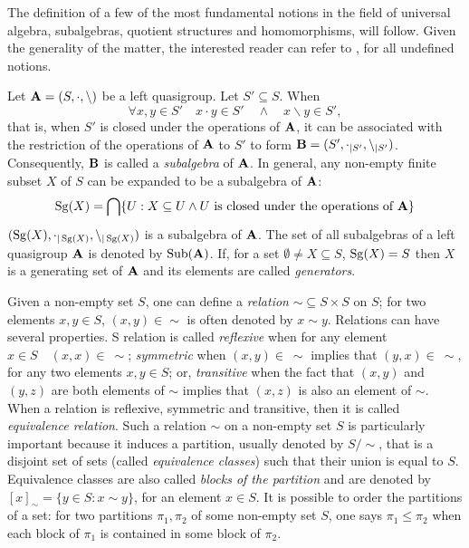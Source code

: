 \noindent The definition of a few of the most fundamental notions in the field of universal algebra, subalgebras, quotient structures and homomorphisms, will follow. Given the generality of the matter, the interested reader can refer to \cite{burris1981course}, for all undefined notions.
\begin{definition} \cite{burris1981course}\newline
Let $\mathbf{A} = (S, \cdot, \backslash)$ be a left quasigroup. Let $S'\subseteq S$. When \[\forall x,y \in S'\quad x\cdot y \in S'\quad\land\quad x\backslash y \in S',\]
that is, when $S'$ is closed under the operations of $\mathbf{A}$, it can be associated with the restriction of the operations of $\mathbf{A}$ to $S'$ to form $\mathbf{B} = (S', \cdot_{|S'}, \backslash_{|S'})$. Consequently, $\mathbf{B}$ is called a \emph{subalgebra} of $\mathbf{A}$. \newline In general, any non-empty finite subset $X$ of $S$ can be expanded to be a subalgebra of $\mathbf{A}$:
 \[ \operatorname{Sg}(X) = \bigcap\{U : X \subseteq U \land U~\text{is closed under the operations of}~\mathbf{A} \} \]
 $(\operatorname{Sg}(X), \cdot_{|\operatorname{Sg}(X)}, \backslash_{|\operatorname{Sg}(X)})$ is a subalgebra of $\mathbf{A}$.\newline
 The set of all subalgebras of a left quasigroup $\mathbf{A}$ is denoted by $\operatorname{Sub}(\mathbf{A})$.\newline
 If, for a set $\emptyset \neq X \subseteq S$, $\operatorname{Sg}(X)=S$ then $X$ is a generating set of $\mathbf{A}$ and its elements are called \emph{generators}.
\end{definition}
\noindent Given a non-empty set $S$, one can define a \emph{relation} $\sim\subseteq S\times S$ on $S$; for two elements $x,y\in S$, $(x,y)\in \sim$ is often denoted by $x\sim y$. \newline Relations can have several properties. S relation is called \emph{reflexive} when for any element $x\in S\quad (x,x)\in~\sim$; \emph{symmetric} when $(x,y)\in~\sim$ implies that $(y,x)\in~\sim$, for any two elements $x,y\in S$; or, \emph{transitive} when 
the fact that $(x,y)$ and $(y,z)$ are both elements of $\sim$ implies that 
$(x,z)$ is also an element of $\sim$. When a relation is  reflexive, symmetric and transitive, then it is called \emph{equivalence relation}. \newline Such a relation $\sim$ on a non-empty set $S$ is particularly important because it induces a partition, usually denoted by $S/\sim$, that is a disjoint set of sets (called \emph{equivalence classes}) such that their union is equal to $S$.  Equivalence classes are also called \emph{blocks of the partition} and are denoted by $[x]_\sim = \{ y \in S : x \sim y\}$, for an element $x\in S$. It is possible to order the partitions of a set:  for two partitions $\pi_1,\pi_2$ of some non-empty set $S$, one says $\pi_1 \leq \pi_2$ when each block of $\pi_1$ is contained in some block of $\pi_2$.\newline 

